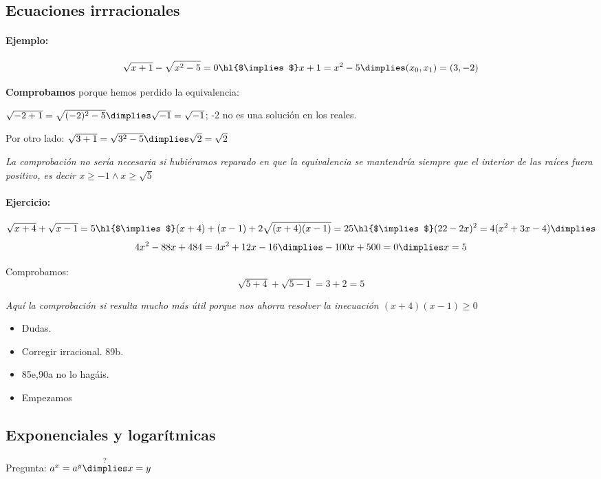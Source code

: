 \subsection{Ecuaciones irrracionales}

\paragraph{Ejemplo:}
\[
	\sqrt{x+1} - \sqrt{x^2-5}=0 \text{\hl{$\implies$}} x+1 = x^2-5 \dimplies (x_0,x_1) = (3,-2)
\]

\textbf{Comprobamos} porque hemos perdido la equivalencia: 

$\sqrt{-2+1} = \sqrt{(-2)^2-5} \dimplies \sqrt{-1} = \sqrt{-1}$; -2 no es una solución en los reales.

Por otro lado: $\sqrt{3+1} = \sqrt{3^2-5} \dimplies \sqrt{2}=\sqrt{2}$

\textit{La comprobación no sería necesaria si hubiéramos reparado en que la equivalencia se mantendría siempre que el interior de las raíces fuera positivo, es decir $x\geq -1 \wedge x\geq \sqrt{5}$}

\paragraph{Ejercicio:} 
\[
	\sqrt{x+4}+\sqrt{x-1} = 5 \text{\hl{$\implies$}} (x+4)+(x-1) + 2\sqrt{(x+4)(x-1)} = 25 \text{\hl{$\implies$}} (22-2x)^2 = 4(x^2+3x-4) \dimplies 
\]
\[
	4x^2-88x + 484 = 4x^2+12x-16 \dimplies -100x + 500 = 0 \dimplies x=5
\]

Comprobamos:
\[
	\sqrt{5+4}+\sqrt{5-1} = 3+2 = 5
\]

\textit{Aquí la comprobación si resulta mucho más útil porque nos ahorra resolver la inecuación $(x+4)(x-1) \geq 0$}

\begin{itemize}
	\item Dudas.
	\item Corregir irracional. 89b.
	\item 85e,90a no lo hagáis.
	\item Empezamos 
\end{itemize}



\subsection{Exponenciales y logarítmicas}

Pregunta: $a^x=a^y \overset{?}{\dimplies} x=y$

